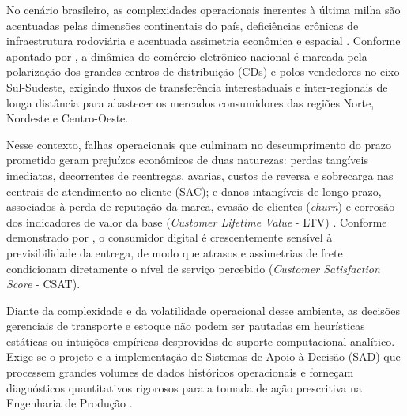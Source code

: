 \documentclass[10pt,a4paper,twocolumn]{article}
\begin{document}
No cenário brasileiro, as complexidades operacionais inerentes à última milha são acentuadas pelas dimensões continentais do país, deficiências crônicas de infraestrutura rodoviária e acentuada assimetria econômica e espacial \citep{novaes2007logistica,oliveira2022desafios}. Conforme apontado por \citet{matos2025}, a dinâmica do comércio eletrônico nacional é marcada pela polarização dos grandes centros de distribuição (CDs) e polos vendedores no eixo Sul-Sudeste, exigindo fluxos de transferência interestaduais e inter-regionais de longa distância para abastecer os mercados consumidores das regiões Norte, Nordeste e Centro-Oeste.

Nesse contexto, falhas operacionais que culminam no descumprimento do prazo prometido geram prejuízos econômicos de duas naturezas: perdas tangíveis imediatas, decorrentes de reentregas, avarias, custos de reversa e sobrecarga nas centrais de atendimento ao cliente (SAC); e danos intangíveis de longo prazo, associados à perda de reputação da marca, evasão de clientes (\textit{churn}) e corrosão dos indicadores de valor da base (\textit{Customer Lifetime Value} - LTV) \citep{reichheld2003one,sucena2023}. Conforme demonstrado por \citet{sucena2023}, o consumidor digital é crescentemente sensível à previsibilidade da entrega, de modo que atrasos e assimetrias de frete condicionam diretamente o nível de serviço percebido (\textit{Customer Satisfaction Score} - CSAT).

Diante da complexidade e da volatilidade operacional desse ambiente, as decisões gerenciais de transporte e estoque não podem ser pautadas em heurísticas estáticas ou intuições empíricas desprovidas de suporte computacional analítico. Exige-se o projeto e a implementação de Sistemas de Apoio à Decisão (SAD) que processem grandes volumes de dados históricos operacionais e forneçam diagnósticos quantitativos rigorosos para a tomada de ação prescritiva na Engenharia de Produção \citep{ballou2006gerenciamento,armbrust2021lakehouse}.
\end{document}
